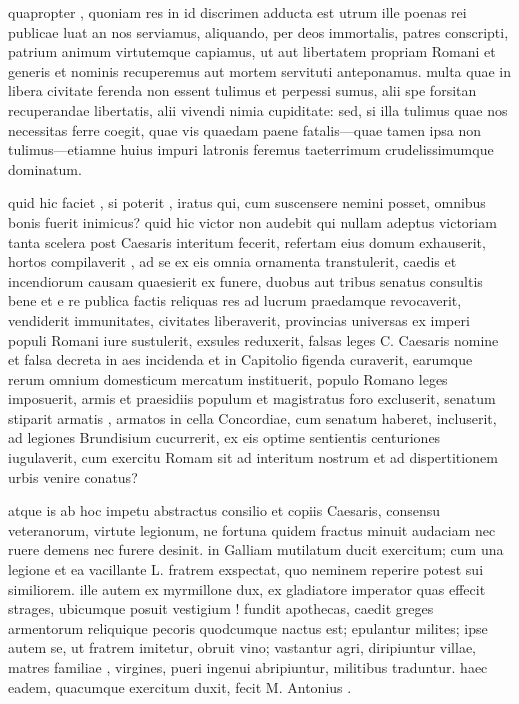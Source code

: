  quapropter , quoniam res in id discrimen adducta est utrum ille poenas rei publicae luat an nos serviamus, aliquando, per deos immortalis, patres conscripti, patrium animum virtutemque capiamus, ut aut libertatem propriam Romani et generis et nominis recuperemus aut mortem servituti anteponamus. multa quae in libera civitate ferenda non essent tulimus et perpessi sumus, alii spe forsitan recuperandae libertatis, alii vivendi nimia cupiditate: sed, si illa tulimus quae nos necessitas ferre coegit, quae vis quaedam paene fatalis—quae tamen ipsa non tulimus—etiamne huius impuri latronis feremus taeterrimum crudelissimumque dominatum.

 quid hic faciet , si poterit , iratus qui, cum suscensere nemini posset, omnibus bonis fuerit inimicus? quid hic victor non audebit qui nullam adeptus victoriam tanta scelera post Caesaris interitum fecerit, refertam eius domum exhauserit, hortos compilaverit , ad se ex eis omnia ornamenta transtulerit, caedis et incendiorum causam quaesierit ex funere, duobus aut tribus senatus consultis bene et e re publica factis reliquas res ad lucrum praedamque revocaverit, vendiderit immunitates, civitates liberaverit, provincias universas ex imperi populi Romani iure sustulerit, exsules reduxerit, falsas leges C. Caesaris nomine et falsa decreta in aes incidenda et in Capitolio figenda curaverit, earumque rerum omnium domesticum mercatum instituerit, populo Romano leges imposuerit, armis et praesidiis populum et magistratus foro excluserit, senatum stiparit armatis , armatos in cella Concordiae, cum senatum haberet, incluserit, ad legiones Brundisium cucurrerit, ex eis optime sentientis centuriones iugulaverit, cum exercitu Romam sit ad interitum nostrum et ad dispertitionem urbis venire conatus?

 atque is ab hoc impetu abstractus consilio et copiis Caesaris, consensu veteranorum, virtute legionum, ne fortuna quidem fractus minuit audaciam nec ruere demens nec furere desinit. in Galliam mutilatum ducit exercitum; cum una legione et ea vacillante L. fratrem exspectat, quo neminem reperire potest sui similiorem. ille autem ex myrmillone dux, ex gladiatore imperator quas effecit strages, ubicumque posuit vestigium ! fundit apothecas, caedit greges armentorum reliquique pecoris quodcumque nactus est; epulantur milites; ipse autem se, ut fratrem imitetur, obruit vino; vastantur agri, diripiuntur villae, matres familiae , virgines, pueri ingenui abripiuntur, militibus traduntur. haec eadem, quacumque exercitum duxit, fecit M. Antonius .

